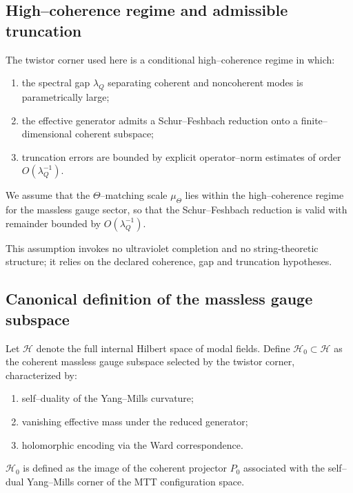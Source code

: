 \documentclass[11pt]{article}
\begin{document}
\subsection{High--coherence regime and admissible truncation}

The twistor corner used here is a conditional high--coherence regime
\cite{Twistor} in which:
\begin{enumerate}
\item the spectral gap $\lambda_Q$ separating coherent and noncoherent modes
is parametrically large;
\item the effective generator admits a Schur--Feshbach reduction onto a
finite--dimensional coherent subspace;
\item truncation errors are bounded by explicit operator--norm estimates
of order $O(\lambda_Q^{-1})$.
\end{enumerate}

\begin{assumption}
We assume that the $\Theta$--matching scale $\mu_\Theta$ lies within the
high--coherence regime for the massless gauge sector, so that the
Schur--Feshbach reduction is valid with remainder bounded by
$O(\lambda_Q^{-1})$.
\end{assumption}

\begin{remark}
This assumption invokes no ultraviolet completion and no string-theoretic
structure; it relies on the declared coherence, gap and truncation hypotheses.
\end{remark}

\subsection{Canonical definition of the massless gauge subspace}

Let $\mathcal H$ denote the full internal Hilbert space of modal fields.
Define $\mathcal H_0\subset\mathcal H$ as the coherent massless gauge subspace
selected by the twistor corner, characterized by:
\begin{enumerate}
\item self--duality of the Yang--Mills curvature;
\item vanishing effective mass under the reduced generator;
\item holomorphic encoding via the Ward correspondence.
\end{enumerate}

\begin{definition}
$\mathcal H_0$ is defined as the image of the coherent projector $P_0$
associated with the self--dual Yang--Mills corner of the MTT configuration
space.
\end{definition}
\end{document}
